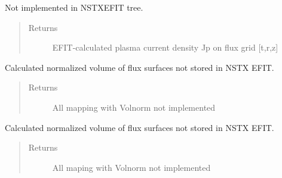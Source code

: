 \documentclass[letterpaper,10pt,english]{sphinxmanual}
\begin{document}
\begin{fulllineitems}
\begin{fulllineitems}
\begin{quote}
\begin{description}
\end{description}\end{quote}

\end{fulllineitems}


\begin{fulllineitems}
\label{\detokenize{eqtools:eqtools.NSTXEFIT.NSTXEFITTree.getJp}}
Not implemented in NSTXEFIT tree.
\begin{quote}\begin{description}
\item[{Returns}] \leavevmode
EFIT-calculated plasma current density Jp on flux grid {[}t,r,z{]}

\end{description}\end{quote}

\end{fulllineitems}


\begin{fulllineitems}
\label{\detokenize{eqtools:eqtools.NSTXEFIT.NSTXEFITTree.rz2volnorm}}
Calculated normalized volume of flux surfaces not stored in NSTX EFIT.
\begin{quote}\begin{description}
\item[{Returns}] \leavevmode
All mapping with Volnorm not implemented

\end{description}\end{quote}

\end{fulllineitems}


\begin{fulllineitems}
\label{\detokenize{eqtools:eqtools.NSTXEFIT.NSTXEFITTree.psinorm2volnorm}}
Calculated normalized volume of flux surfaces not stored in NSTX EFIT.
\begin{quote}\begin{description}
\item[{Returns}] \leavevmode
All maping with Volnorm not implemented

\end{description}\end{quote}

\end{fulllineitems}


\end{fulllineitems}
\end{document}
